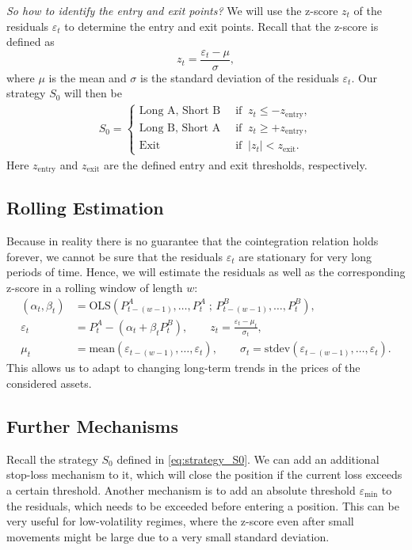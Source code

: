 \documentclass{article}
\begin{document}
\textit{So how to identify the entry and exit points?} 
We will use the z-score \(z_t\) of the residuals \(\varepsilon_t\) to determine the entry and exit points.
Recall that the z-score is defined as
\[
z_t = \frac{\varepsilon_t - \mu}{\sigma},
\]
where \(\mu\) is the mean and \(\sigma\) is the standard deviation of the residuals \(\varepsilon_t\).
Our strategy $S_0$ will then be
\begin{align}
    S_0 = \begin{cases}
        \text{Long A, Short B} &\;\;\text{if}\;\; z_t \le -z_{\mathrm{entry}},\\
        \text{Long B, Short A} &\;\;\text{if}\;\; z_t \ge +z_{\mathrm{entry}},\\
        \text{Exit} &\;\;\text{if}\;\; |z_t| < z_{\mathrm{exit}}.
    \end{cases} \label{eq:strategy_S0}
\end{align}
Here \(z_{\mathrm{entry}}\) and \(z_{\mathrm{exit}}\) are the defined entry and exit thresholds, respectively.

\subsection{Rolling Estimation}
Because in reality there is no guarantee that the cointegration relation holds forever, we cannot be sure that the residuals $\varepsilon_t$ are stationary for very long periods of time.
Hence, we will estimate the residuals as well as the corresponding z-score in a rolling window of length $w$:
\begin{align*}
(\alpha_t,\beta_t) &= \text{OLS}\left(P_{t-(w-1)}^{A},\dots,P_{t}^{A}\;
\text{; } P_{t-(w-1)}^{B},\dots,P_{t}^{B}\right), \\
\varepsilon_t &= P_t^{A} - (\alpha_t + \beta_t P_t^{B}), \qquad z_t = \frac{\varepsilon_t - \mu_{t}}{\sigma_{t}}, \\
\mu_{t} &= \text{mean} \left(\varepsilon_{t-(w-1)},\dots,\varepsilon_{t}\right), \qquad
\sigma_{t} = \text{stdev}\left(\varepsilon_{t-(w-1)},\dots,\varepsilon_{t}\right).
\end{align*}
This allows us to adapt to changing long-term trends in the prices of the considered assets.

\subsection{Further Mechanisms}
Recall the strategy $S_0$ defined in \eqref{eq:strategy_S0}. We can add an additional stop-loss mechanism to it, which will close the position if the current loss exceeds a certain threshold.
Another mechanism is to add an absolute threshold $\varepsilon_{\mathrm{min}}$ to the residuals, which needs to be exceeded before entering a position.
This can be very useful for low-volatility regimes, where the z-score even after small movements might be large due to a very small standard deviation.
\end{document}
